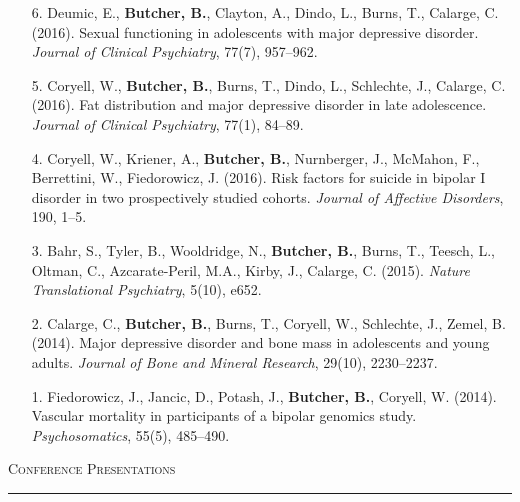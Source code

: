\documentclass[a4paper]{article}
\begin{document}
\begin{enumerate}
  \item[6.] Deumic, E., \textbf{Butcher, B.}, Clayton, A., Dindo, L., Burns, T., Calarge,
    C. (2016). Sexual functioning in adolescents with major depressive disorder.
    \textit{Journal of Clinical Psychiatry}, 77(7), 957--962.

  \item[5.] Coryell, W., \textbf{Butcher, B.}, Burns, T., Dindo, L., Schlechte, J.,
    Calarge, C. (2016). Fat distribution and major depressive disorder in
    late adolescence. \textit{Journal of Clinical Psychiatry}, 77(1), 84--89.

  \item[4.] Coryell, W., Kriener, A., \textbf{Butcher, B.}, Nurnberger, J., McMahon, F.,
    Berrettini, W., Fiedorowicz, J. (2016). Risk factors for suicide in bipolar
    I disorder in two prospectively studied cohorts. \textit{Journal of Affective
    Disorders}, 190, 1--5.

  \item[3.] Bahr, S., Tyler, B., Wooldridge, N., \textbf{Butcher, B.}, Burns, T., Teesch, L.,
    Oltman, C., Azcarate-Peril, M.A., Kirby, J., Calarge, C. (2015).
    \textit{Nature Translational Psychiatry}, 5(10), e652.

  \item[2.] Calarge, C., \textbf{Butcher, B.}, Burns, T., Coryell, W., Schlechte, J., Zemel,
    B. (2014). Major depressive disorder and bone mass in adolescents and young
    adults. \textit{Journal of Bone and Mineral Research}, 29(10), 2230--2237.

  \item[1.] Fiedorowicz, J., Jancic, D., Potash, J., \textbf{Butcher, B.}, Coryell, W.
    (2014). Vascular mortality in participants of a bipolar genomics study.
    \textit{Psychosomatics}, 55(5), 485--490.

\end{enumerate}


\begin{flushleft}
  \Large\textsc{Conference Presentations}
  \textcolor{usafagrey}{\rule[0.5\baselineskip]{\textwidth}{0.75pt}}
\end{flushleft}
\vspace{-1.5\baselineskip}
\end{document}
